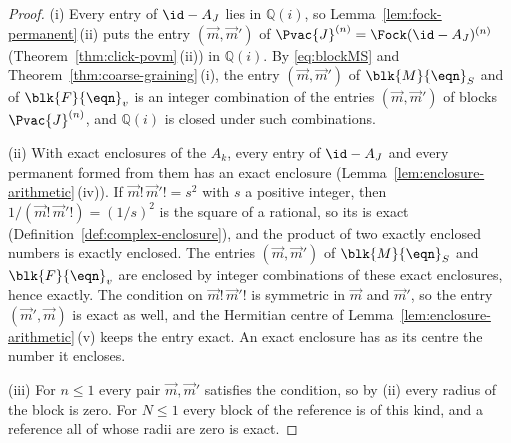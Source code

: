 \begin{proof}
(i) Every entry of $\id-A_J$ lies in $\mathbb{Q}(i)$, so
Lemma~\ref{lem:fock-permanent}\,(ii) puts the entry $(\vec m,\vec m')$ of
$\Pvac{J}^{(n)}=\Fock(\id-A_J)^{(n)}$ (Theorem~\ref{thm:click-povm}\,(ii)) in
$\mathbb{Q}(i)$. By \eqref{eq:blockMS} and
Theorem~\ref{thm:coarse-graining}\,(i), the entry $(\vec m,\vec m')$ of
$\blk{M}{\eqn}_S$ and of $\blk{F}{\eqn}_v$ is an integer combination of the
entries $(\vec m,\vec m')$ of blocks $\Pvac{J}^{(n)}$, and $\mathbb{Q}(i)$ is
closed under such combinations.

(ii) With exact enclosures of the $A_k$, every entry of $\id-A_J$ and every
permanent formed from them has an exact enclosure
(Lemma~\ref{lem:enclosure-arithmetic}\,(iv)). If
$\vec m!\,\vec m'!=s^{2}$ with $s$ a positive integer, then
$1/(\vec m!\,\vec m'!)=(1/s)^{2}$ is the square of a rational, so its
 is exact (Definition~\ref{def:complex-enclosure}),
and the product of two exactly enclosed numbers is exactly enclosed. The
entries $(\vec m,\vec m')$ of $\blk{M}{\eqn}_S$ and $\blk{F}{\eqn}_v$ are
enclosed by integer combinations of these exact enclosures, hence exactly. The
condition on $\vec m!\,\vec m'!$ is symmetric in $\vec m$ and $\vec m'$, so
the entry $(\vec m',\vec m)$ is exact as well, and the Hermitian centre of
Lemma~\ref{lem:enclosure-arithmetic}\,(v) keeps the entry exact. An exact
enclosure has as its centre the number it encloses.

(iii) For $n\le1$ every pair $\vec m,\vec m'$ satisfies the condition, so by
(ii) every radius of the block is zero. For $N\le1$ every block of the
reference is of this kind, and a reference all of whose radii are zero is
exact.
\end{proof}
